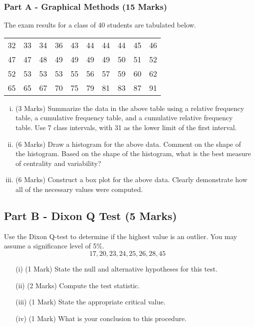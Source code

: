 \documentclass[a4paper,12pt]{article}
\begin{document}
\subsubsection*{Part A - Graphical Methods (15 Marks)} %
The exam results for a class of 40 students are tabulated below.
\begin{table}[ht]
	\begin{center}
		\begin{tabular}{|rrrrrrrrrr|}
			\hline
			  32 &  33 &  34 &  36 &  43 &  44 &  44 &  44 &  45 &  46 \\ 
		      47 &  47 &  48 &  49 &  49 &  49 &  49 &  50 &  51 &  52 \\ 
			  52 &  53 &  53 &  53 &  55 &  56 &  57 &  59 &  60 &  62 \\ 
			  65 &  65 &  67 &  70 &  75 &  79 &  81 &  83 &  87 &  91 \\ 		\hline
		\end{tabular}
	\end{center}
\end{table}
\vspace{-0.5cm}
\begin{enumerate}[(i)]
	\item (3 Marks) Summarize the data in the above table using a relative frequency table, a cumulative frequency table, and a cumulative relative frequency table. Use 7 class intervals, with 31 as the lower limit of the first interval.
	\item (6 Marks) Draw a histogram for the above data. Comment on the shape of the histogram. Based on the shape of the histogram, what is the best measure of centrality and variability?
	\item (6 Marks) Construct a box plot for the above data. Clearly demonstrate how all of the necessary values were computed.
\end{enumerate}


\subsection*{Part B - Dixon Q Test (5 Marks)}

	
	Use the Dixon Q-test to determine if the highest value is an outlier. You may assume a significance level of 5\%.
		\[ 17,20,23,24,25,26,28,45\]
	\begin{itemize}
		\item[(i)](1 Mark) State the null and alternative hypotheses for this test.
		\item[(ii)](2 Marks) Compute the test statistic.
		\item[(iii)](1 Mark) State the appropriate critical value.
		\item[(iv)](1 Mark) What is your conclusion to this procedure.
	\end{itemize}
\end{document}
